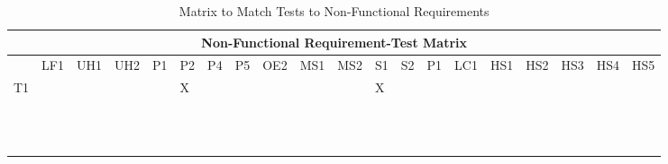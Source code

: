 \documentclass[11pt]{article}
\begin{document}
\begin{table}[H]
\centering
\caption{Matrix to Match Tests to Non-Functional Requirements}
\label{my-label}
\begin{tabular}{| l | l | l | l | l | l | l | l | l | l | l | l | l | l | l | l | l | l | l | l |}
\hline
\multicolumn{20}{|c|}{\textbf{Non-Functional Requirement-Test Matrix}}                          \\ \hline
 & \tiny{LF1} & \tiny{UH1} & \tiny{UH2} & \tiny{P1} & \tiny{P2} & \tiny{P4} & \tiny{P5} & \tiny{OE2} & \tiny{MS1} & \tiny{MS2} & \tiny{S1} & \tiny{S2} & \tiny{P1} & \tiny{LC1} & \tiny{HS1} & \tiny{HS2} & \tiny{HS3} & \tiny{HS4} & \tiny{HS5} \\ \hline
T1 &  &  &  &  & X &  &  &  &  &  & X &  &  &  &  &  &  &  &  \\ \hline
          &             &           &  &  &  &  &  &  &  &  &  &  &  &  &  &  & & &  \\ \hline
          &             &           &  &  &  &  &  &  &  &  &  &  &  &  &  &  & & &  \\ \hline
          &             &           &  &  &  &  &  &  &  &  &  &  &  &  &  &  & & & \\ \hline
          &             &           &  &  &  &  &  &  &  &  &  &  &  &  &  &  & & & \\ \hline
          &             &           &  &  &  &  &  &  &  &  &  &  &  &  &  &  & & & \\ \hline
          &             &           &  &  &  &  &  &  &  &  &  &  &  &  &  &  & & & \\ \hline
          &             &           &  &  &  &  &  &  &  &  &  &  &  &  &  &  & & & \\ \hline
          &             &           &  &  &  &  &  &  &  &  &  &  &  &  &  &  & & &\\ \hline
          &             &           &  &  &  &  &  &  &  &  &  &  &  &  &  &  & & & \\ \hline
          &             &           &  &  &  &  &  &  &  &  &  &  &  &  &  &  & & & \\ \hline
          &             &           &  &  &  &  &  &  &  &  &  &  &  &  &  &  & & & \\ \hline
          &             &           &  &  &  &  &  &  &  &  &  &  &  &  &  &  & & & \\ \hline
\end{tabular}
\end{table}
\end{document}
